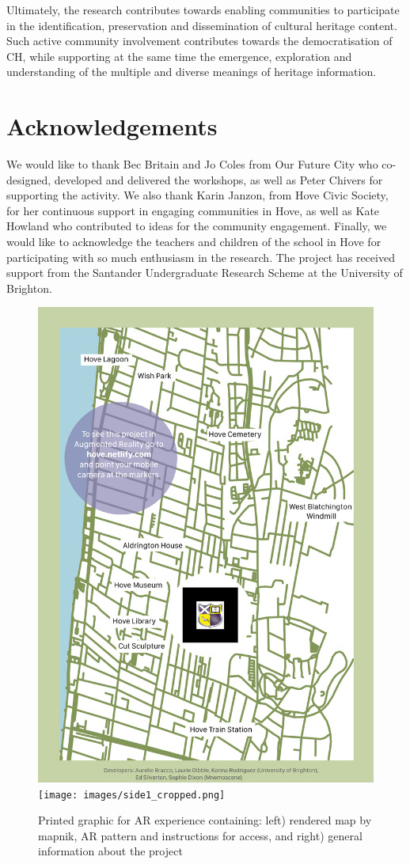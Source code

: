\documentclass[acmlarge,screen,dvipsnames]{acmart}
\begin{document}
   

Ultimately, the research contributes towards enabling communities to
participate in the identification, preservation and dissemination of cultural heritage content. Such active community involvement contributes towards the democratisation of CH, while supporting at the same time the emergence, exploration and understanding of the multiple and diverse meanings of heritage information.


\section{Acknowledgements} We would like to thank Bec Britain and Jo Coles
from Our Future City who co-designed, developed and delivered the workshops, as
well as Peter Chivers for supporting the activity. We also thank Karin Janzon,
from Hove Civic Society, for her continuous support in engaging communities in
Hove, as well as Kate Howland who contributed to ideas for the community engagement. 
Finally, we would like to acknowledge the teachers and children of the
school in Hove for participating with so much enthusiasm in the research. 
The project has received support from the Santander Undergraduate Research Scheme
at the University of Brighton.




%

 

\newpage \begin{figure}[ht] \centering
\includegraphics[width=0.49\linewidth]{images/side.png}
\texttt{[image: images/side1\_cropped.png]}
\caption{Printed graphic for AR experience containing: left) rendered map by
mapnik, AR pattern and instructions for access, and right) general information
about the project} \label{fig:print} \end{figure}
\end{document}
